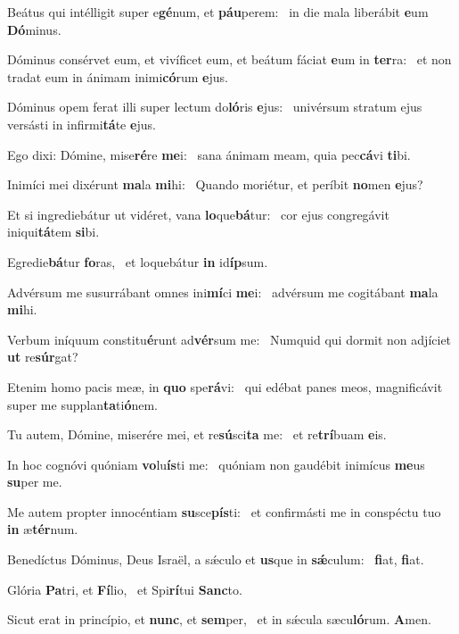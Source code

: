 \item Beátus qui intélligit super e\textbf{gé}num, et \textbf{páu}perem:~\psstar{} in die mala liberábit \textbf{e}um \textbf{Dó}minus.
\item Dóminus consérvet eum, et vivíficet eum, et beátum fáciat \textbf{e}um in \textbf{ter}ra:~\psstar{} et non tradat eum in ánimam inimi\textbf{có}rum \textbf{e}jus.
\item Dóminus opem ferat illi super lectum do\textbf{ló}ris \textbf{e}jus:~\psstar{} univérsum stratum ejus versásti in infirmi\textbf{tá}te \textbf{e}jus.
\item Ego dixi: Dómine, mise\textbf{ré}re \textbf{me}i:~\psstar{} sana ánimam meam, quia pec\textbf{cá}vi \textbf{ti}bi.
\item Inimíci mei dixérunt \textbf{ma}la \textbf{mi}hi:~\psstar{} Quando moriétur, et períbit \textbf{no}men \textbf{e}jus?
\item Et si ingrediebátur ut vidéret, vana \textbf{lo}que\textbf{bá}tur:~\psstar{} cor ejus congregávit iniqui\textbf{tá}tem \textbf{si}bi.
\item Egredie\textbf{bá}tur \textbf{fo}ras,~\psstar{} et loquebátur \textbf{in} id\textbf{íp}sum.
\item Advérsum me susurrábant omnes ini\textbf{mí}ci \textbf{me}i:~\psstar{} advérsum me cogitábant \textbf{ma}la \textbf{mi}hi.
\item Verbum iníquum constitu\textbf{é}runt ad\textbf{vér}sum me:~\psstar{} Numquid qui dormit non adjíciet \textbf{ut} re\textbf{súr}gat?
\item Etenim homo pacis meæ, in \textbf{quo} spe\textbf{rá}vi:~\psstar{} qui edébat panes meos, magnificávit super me supplan\textbf{ta}ti\textbf{ó}nem.
\item Tu autem, Dómine, miserére mei, et re\textbf{sú}sci\textbf{ta} me:~\psstar{} et re\textbf{trí}buam \textbf{e}is.
\item In hoc cognóvi quóniam \textbf{vo}lu\textbf{ís}ti me:~\psstar{} quóniam non gaudébit inimícus \textbf{me}us \textbf{su}per me.
\item Me autem propter innocéntiam \textbf{su}sce\textbf{pís}ti:~\psstar{} et confirmásti me in conspéctu tuo \textbf{in} æ\textbf{tér}num.
\item Benedíctus Dóminus, Deus Israël, a sǽculo et \textbf{us}que in \textbf{sǽ}culum:~\psstar{} \textbf{fi}at, \textbf{fi}at.
\item Glória \textbf{Pa}tri, et \textbf{Fí}lio,~\psstar{} et Spi\textbf{rí}tui \textbf{Sanc}to.
\item Sicut erat in princípio, et \textbf{nunc}, et \textbf{sem}per,~\psstar{} et in sǽcula sæcu\textbf{ló}rum. \textbf{A}men.
